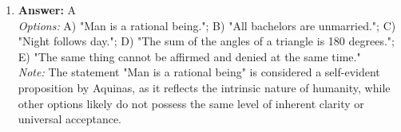 \documentclass[12pt]{article}
\begin{document}
\begin{enumerate}[label=\arabic*.]
\\ \textit{Note:} Cicero posits that by following Nature as our guide, we align ourselves with the inherent moral order and rational principles that govern the universe, ensuring that our decisions are in harmony with true ethical values.
\item \textbf{Answer:} A
\\ \textit{Options:} A) "Man is a rational being."; B) "All bachelors are unmarried."; C) "Night follows day."; D) "The sum of the angles of a triangle is 180 degrees."; E) "The same thing cannot be affirmed and denied at the same time."
\\ \textit{Note:} The statement "Man is a rational being" is considered a self-evident proposition by Aquinas, as it reflects the intrinsic nature of humanity, while other options likely do not possess the same level of inherent clarity or universal acceptance.
\end{enumerate}
\end{document}
